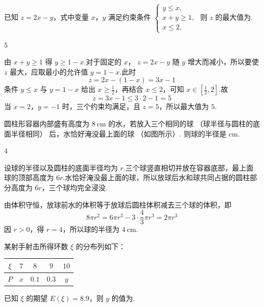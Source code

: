 \begin{problem}
已知 \(z = 2x - y\)，式中变量 \(x\)，\(y\) 满足约束条件 \(\begin{cases}
y \leqslant x,\\
x + y \geqslant 1,\\
x \leqslant 2,
\end{cases}\) 则 \(z\) 的最大值为\fillinblank{}.
\end{problem}

\begin{answer}
\(5\)
\end{answer}

\begin{solution}
由 \(x+y\geqslant1\) 得 \(y\geqslant1-x\).对于固定的 \(x\)，
\(z=2x-y\) 随 \(y\) 增大而减小，所以要使 \(z\) 最大，应取最小的允许值
\(y=1-x\).此时
\[
z=2x-(1-x)=3x-1
\]
条件 \(y\leqslant x\) 与 \(y=1-x\) 给出 \(x\geqslant\frac12\)，再结合
\(x\leqslant2\)，可知 \(x\in[\frac12,2]\).故
\[
z=3x-1\leqslant3\cdot2-1=5
\]
当 \(x=2\)，\(y=-1\) 时，三个约束均满足，且 \(z=5\)，所以最大值为 \(5\).
\end{solution}

\begin{problem}
圆柱形容器内部盛有高度为 \(8 \mathrm{~cm}\) 的水，若放入三个相同的球 （球半径与圆柱的底面半径相同） 后，水恰好淹没最上面的球 （如图所示）. 则球的半径是\fillinblank{} \(\mathrm{cm}\).
\end{problem}

\begin{answer}
\(4\)
\end{answer}

\begin{solution}
设球的半径以及圆柱的底面半径均为 \(r\).三个球竖直相切并放在容器底部，最上面球的顶部高度为 \(6r\).水恰好淹没最上面的球，所以放球后水和球共同占据的圆柱部分高度为 \(6r\)，三个球均完全浸没.

由体积守恒，放球前水的体积等于放球后圆柱体积减去三个球的体积，即
\[
8\pi r^2
=6\pi r^3-3\cdot\frac43\pi r^3
=2\pi r^3
\]
因 \(r>0\)，得 \(r=4\)，所以球的半径为 \(4 \mathrm{~cm}\).
\end{solution}

\begin{problem}
某射手射击所得环数 \(\xi\) 的分布列如下：

\begin{center}
\begin{tabular}{c|cccc}
\(\xi\) & \(7\) & \(8\) & \(9\) & \(10\) \\
\hline
\(P\) & \(x\) & \(0.1\) & \(0.3\) & \(y\)
\end{tabular}
\end{center}
已知 \(\xi\) 的期望 \(E(\xi) = 8.9\)，则 \(y\) 的值为\fillinblank{}.
\end{problem}

